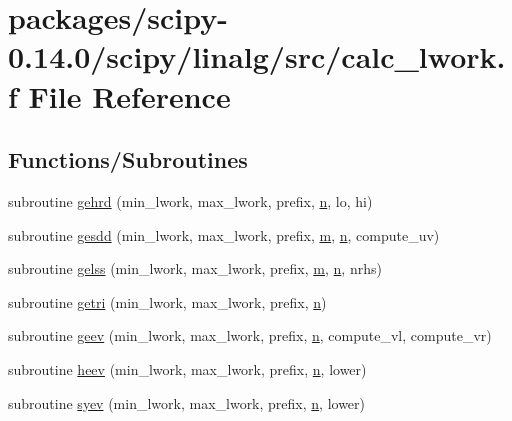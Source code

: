 \hypertarget{linalg_2src_2calc__lwork_8f}{}\section{packages/scipy-\/0.14.0/scipy/linalg/src/calc\+\_\+lwork.f File Reference}
\label{linalg_2src_2calc__lwork_8f}
\subsection*{Functions/\+Subroutines}
\begin{DoxyCompactItemize}
\item 
subroutine \hyperlink{linalg_2src_2calc__lwork_8f_ae86a9f0aca5e035a17b8476464a1e5b0}{gehrd} (min\+\_\+lwork, max\+\_\+lwork, prefix, \hyperlink{indexexpr_8h_ab427e2e2b4d6cec55fa088ea2a692ace}{n}, lo, hi)
\item 
subroutine \hyperlink{linalg_2src_2calc__lwork_8f_aabd0abe0467e4596a4e3fa2218360d7b}{gesdd} (min\+\_\+lwork, max\+\_\+lwork, prefix, \hyperlink{indexexpr_8h_ab72fdb4031d47b75ab26dd18a437bcdc}{m}, \hyperlink{indexexpr_8h_ab427e2e2b4d6cec55fa088ea2a692ace}{n}, compute\+\_\+uv)
\item 
subroutine \hyperlink{linalg_2src_2calc__lwork_8f_ae1caaada5b9792a0066d1e20616e40cb}{gelss} (min\+\_\+lwork, max\+\_\+lwork, prefix, \hyperlink{indexexpr_8h_ab72fdb4031d47b75ab26dd18a437bcdc}{m}, \hyperlink{indexexpr_8h_ab427e2e2b4d6cec55fa088ea2a692ace}{n}, nrhs)
\item 
subroutine \hyperlink{linalg_2src_2calc__lwork_8f_a0e2dbd8c022170c3b6b6690870c0765b}{getri} (min\+\_\+lwork, max\+\_\+lwork, prefix, \hyperlink{indexexpr_8h_ab427e2e2b4d6cec55fa088ea2a692ace}{n})
\item 
subroutine \hyperlink{linalg_2src_2calc__lwork_8f_a47ece4f48907a8042e0cb1881f56b0b0}{geev} (min\+\_\+lwork, max\+\_\+lwork, prefix, \hyperlink{indexexpr_8h_ab427e2e2b4d6cec55fa088ea2a692ace}{n}, compute\+\_\+vl, compute\+\_\+vr)
\item 
subroutine \hyperlink{linalg_2src_2calc__lwork_8f_a3c991754759e50e9389c26c734c1acd0}{heev} (min\+\_\+lwork, max\+\_\+lwork, prefix, \hyperlink{indexexpr_8h_ab427e2e2b4d6cec55fa088ea2a692ace}{n}, lower)
\item 
subroutine \hyperlink{linalg_2src_2calc__lwork_8f_ac56bbcad59c85c1352cd4c0f970c2f91}{syev} (min\+\_\+lwork, max\+\_\+lwork, prefix, \hyperlink{indexexpr_8h_ab427e2e2b4d6cec55fa088ea2a692ace}{n}, lower)

\end{DoxyCompactItemize}
